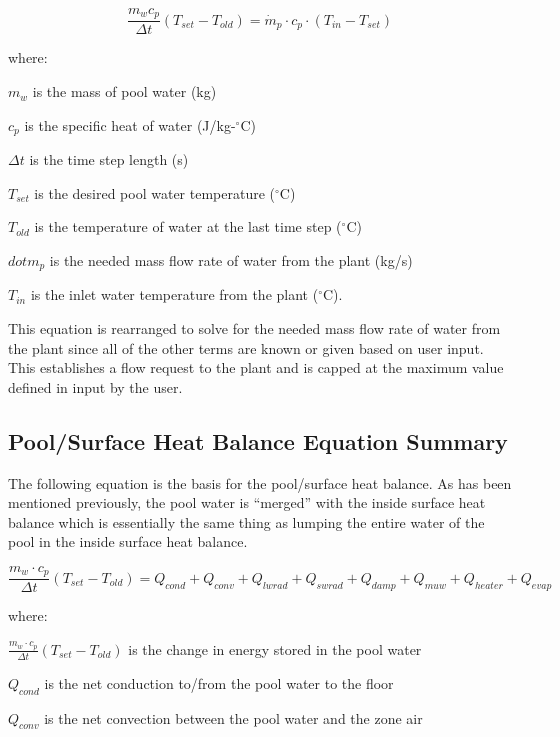 \begin{equation}
\frac{m_w c_p}{\Delta t} (T_{set}-T_{old}) = \dot{m}_p \cdot c_p \cdot (T_{in} - T_{set} )
\end{equation}

where:

\(m_w\) is the mass of pool water (kg)

\(c_p\) is the specific heat of water (J/kg-\(^{\circ}\)C)

\(\Delta t\) is the time step length (s)

\(T_{set}\) is the desired pool water temperature (\(^{\circ}\)C)

\(T_{old}\) is the temperature of water at the last time step (\(^{\circ}\)C)

\(dot{m}_p\) is the needed mass flow rate of water from the plant (kg/s)

\(T_{in}\) is the inlet water temperature from the plant (\(^{\circ}\)C).


This equation is rearranged to solve for the needed mass flow rate of water from the plant since all of the other terms are known or given based on user input. This establishes a flow request to the plant and is capped at the maximum value defined in input by the user.

\subsection{Pool/Surface Heat Balance Equation Summary}\label{poolsurface-heat-balance-equation-summary}

The following equation is the basis for the pool/surface heat balance. As has been mentioned previously, the pool water is ``merged'' with the inside surface heat balance which is essentially the same thing as lumping the entire water of the pool in the inside surface heat balance.

\begin{equation}
\frac{m_w \cdot c_p}{\Delta t} (T_{set} - T_{old}) = Q_{cond} + Q_{conv} + Q_{lwrad} + Q_{swrad} + Q_{damp} + Q_{muw} + Q_{heater} + Q_{evap}
\end{equation}

where:

\(\frac{m_w \cdot c_p}{\Delta t} (T_{set} - T_{old} )\) is the change in energy stored in the pool water

\(Q_{cond}\) is the net conduction to/from the pool water to the floor

\(Q_{conv}\) is the net convection between the pool water and the zone air

